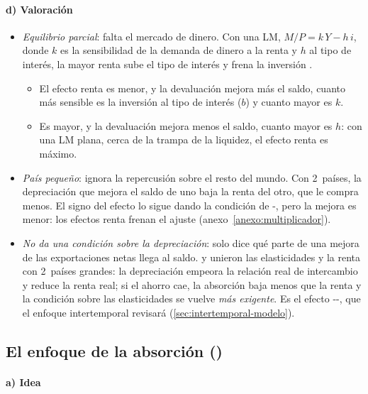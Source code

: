 \documentclass[11pt]{article}
\begin{document}
\paragraph{d) Valoración}

\begin{itemize}
\item \emph{Equilibrio parcial}: falta el mercado de dinero. Con una LM, $M/P=k\,Y-h\,i$, donde $k$ es la sensibilidad de la demanda de dinero a la renta y $h$ al tipo de interés, la mayor renta sube el tipo de interés y frena la inversión .
  \begin{itemize}
  \item El efecto renta es menor, y la devaluación mejora más el saldo, cuanto más sensible es la inversión al tipo de interés ($b$) y cuanto mayor es $k$.
  \item Es mayor, y la devaluación mejora menos el saldo, cuanto mayor es $h$: con una LM plana, cerca de la trampa de la liquidez, el efecto renta es máximo.
  \end{itemize}
\item \emph{País pequeño}: ignora la repercusión sobre el resto del mundo. Con 2~países, la depreciación que mejora el saldo de uno baja la renta del otro, que le compra menos. El signo del efecto lo sigue dando la condición de -, pero la mejora es menor: los efectos renta frenan el ajuste (anexo~\ref{anexo:multiplicador}).
\item \emph{No da una condición sobre la depreciación}: solo dice qué parte de una mejora de las exportaciones netas llega al saldo. \textcite{Harberger1950Currency} y \textcite{LaursenMetzler1950} unieron las elasticidades y la renta con 2~países grandes: la depreciación empeora la relación real de intercambio y reduce la renta real; si el ahorro cae, la absorción baja menos que la renta y la condición sobre las elasticidades se vuelve \emph{más exigente}. Es el efecto --, que el enfoque intertemporal revisará (\ref{sec:intertemporal-modelo}).
\end{itemize}

\subsection{El enfoque de la absorción ()}\label{sec:absorcion}

\paragraph{a) Idea}
\end{document}
